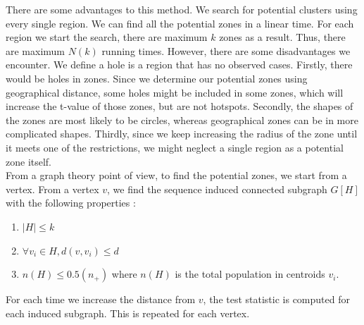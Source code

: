 \documentclass[12pt]{article}
\begin{document}
\begin{enumerate}
			There are some advantages to this method. We search for potential clusters using every single region. We can find all the potential zones in a linear time. For each region we start the search, there are maximum $k$ zones as a result. Thus, there are maximum $N(k)$ running times. However, there are some disadvantages we encounter. We define a hole is a region that has no observed cases. Firstly, there would be holes in zones. Since we determine our potential zones using geographical distance, some holes might be included in some zones, which will increase the t-value of those zones, but are not hotspots. Secondly, the shapes of the zones are most likely to be circles, whereas geographical zones can be in more complicated shapes. Thirdly, since we keep increasing the radius of the zone until it meets one of the restrictions, we might neglect a single region as a potential zone itself. \\  
		From a graph theory point of view, to find the potential zones, we start from a vertex. From a vertex $v$, we find the sequence induced connected subgraph $G[H]$ with the following properties : \\
				\begin{enumerate}
					
					\item $|H| \leq k $ 
					\item $ \forall v_i \in  H, d(v,v_i) \leq d $
					\item $n(H) \leq 0.5(n_+)$ where $n(H)$ is the total population in centroids $v_i$. 
				\end{enumerate}   
				 For each time we increase the distance from $v$, the test statistic is computed for each induced subgraph. This is repeated for each vertex. \\ 
				

\end{enumerate}
\end{document}

